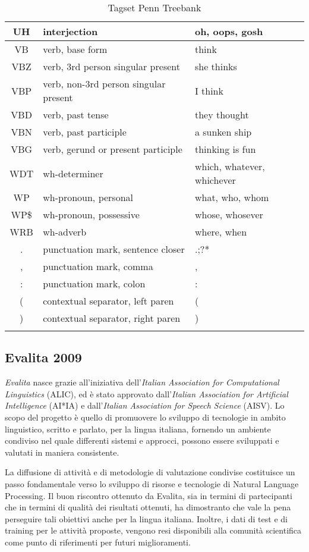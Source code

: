 \begin{longtable}{| c | p{} | p{} |}
  UH & interjection & oh, oops, gosh  \\ \hline
  VB & verb, base form & think  \\ \hline
  VBZ & verb, 3rd person singular present & she thinks  \\ \hline
  VBP & verb, non-3rd person singular present & I think  \\ \hline
  VBD & verb, past tense & they thought  \\ \hline
  VBN & verb, past participle & a sunken ship  \\ \hline
  VBG & verb, gerund or present participle & thinking is fun  \\ \hline
  WDT & wh-determiner & which, whatever, whichever  \\ \hline
  WP & wh-pronoun, personal & what, who, whom  \\ \hline
  WP\$ & wh-pronoun, possessive & whose, whosever  \\ \hline
  WRB & wh-adverb & where, when  \\ \hline
  . & punctuation mark, sentence closer & .;?*  \\ \hline
  , & punctuation mark, comma & ,  \\ \hline
  : & punctuation mark, colon & :  \\ \hline
  ( & contextual separator, left paren & (  \\ \hline
  ) & contextual separator, right paren & ) \\ \hline
  \caption{Tagset Penn Treebank} \label{tab:penn-tagset}
\end{longtable}

\subsection{Evalita 2009}
\emph{Evalita} nasce grazie all'iniziativa dell'\emph{Italian Association for Computational Linguistics} (ALIC),
ed \`e stato approvato dall'\emph{Italian Association for Artificial Intelligence} (AI*IA)
e dall'\emph{Italian Association for Speech Science} (AISV).
Lo scopo del progetto \`e quello di promuovere lo sviluppo di tecnologie in ambito linguistico,
scritto e parlato, per la lingua italiana, fornendo un ambiente condiviso nel quale
differenti sistemi e approcci, possono essere sviluppati e valutati in maniera consistente.

La diffusione di attivit\`a e di metodologie di valutazione condivise costituisce un passo fondamentale
verso lo sviluppo di risorse e tecnologie di Natural Language Processing. Il buon riscontro
ottenuto da Evalita, sia in termini di partecipanti che in termini di qualit\`a dei risultati ottenuti,
ha dimostranto che vale la pena perseguire tali obiettivi anche per la lingua italiana.
Inoltre, i dati di test e di training per le attivit\`a proposte, vengono resi disponibili alla
comunit\`a scientifica come punto di riferimenti per futuri miglioramenti.

